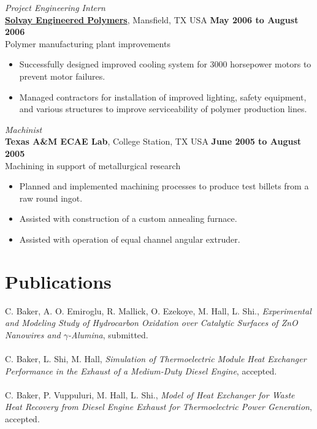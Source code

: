 \documentclass[centered]{res}
\begin{document}
\begin{resume}
%
\textit{Project Engineering Intern} \\
\href{http://www.lyondellbasell.com/LandingPages/SolvayEngineeredPolymers}{\textbf{Solvay
    Engineered Polymers}}, Mansfield, TX USA 
\hfill \textbf{May 2006 to August 2006} \\
Polymer manufacturing plant improvements 
\begin{itemize} \itemsep -2pt %
\item Successfully designed improved cooling system for 3000
  horsepower motors to prevent motor failures.
\item Managed contractors for installation of improved lighting,
  safety equipment, and various structures to improve serviceability
  of polymer production lines.
\end{itemize} 
%
\textit{Machinist} \\
\textbf{Texas A\&M ECAE Lab}, College Station, TX USA
\hfill \textbf{June 2005 to August 2005} \\
Machining in support of metallurgical research 
\begin{itemize} \itemsep -2pt %
\item Planned and implemented machining processes to produce test
  billets from a raw round ingot.
\item Assisted with construction of a custom annealing furnace.
\item Assisted with operation of equal channel angular extruder.
\end{itemize}   

\section{Publications}
C. Baker, A. O. Emiroglu, R. Mallick, O. Ezekoye, M. Hall, L. Shi.,
\textit{Experimental and Modeling Study of Hydrocarbon Oxidation over
  Catalytic Surfaces of ZnO Nanowires and $\gamma$-Alumina}, submitted. \\
\vspace{-5pt} \\
%
C. Baker, L. Shi, M. Hall, \textit{Simulation of Thermoelectric
  Module Heat Exchanger Performance in the Exhaust of a Medium-Duty
  Diesel Engine}, accepted.  \\
\vspace{-5pt} \\
%
C. Baker, P. Vuppuluri, M. Hall, L. Shi., \textit{Model of Heat
  Exchanger for Waste Heat Recovery from Diesel Engine Exhaust for
  Thermoelectric Power Generation}, accepted.  


\end{resume}
\end{document}
